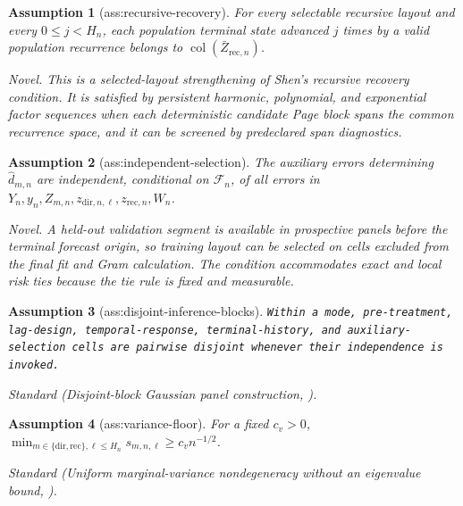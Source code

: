 \documentclass{article}
\newtheorem{assumption}{Assumption}
\begin{document}
\begin{assumption}[ass:recursive-recovery]\label{ass:recursive-recovery}
For every selectable recursive layout and every \(0\le j<H_n\), each population terminal state advanced \(j\) times by a valid population recurrence belongs to \(\operatorname{col}(\bar Z_{\mathrm{rec},n})\).
\par\smallskip\noindent\emph{Novel.} This is a selected-layout strengthening of Shen's recursive recovery condition. It is satisfied by persistent harmonic, polynomial, and exponential factor sequences when each deterministic candidate Page block spans the common recurrence space, and it can be screened by predeclared span diagnostics.
\end{assumption}

\begin{assumption}[ass:independent-selection]\label{ass:independent-selection}
The auxiliary errors determining \(\widehat d_{m,n}\) are independent, conditional on \(\mathcal F_n\), of all errors in \(Y_n,y_n,Z_{m,n},z_{\mathrm{dir},n,\ell},z_{\mathrm{rec},n},W_n\).
\par\smallskip\noindent\emph{Novel.} A held-out validation segment is available in prospective panels before the terminal forecast origin, so training layout can be selected on cells excluded from the final fit and Gram calculation. The condition accommodates exact and local risk ties because the tie rule is fixed and measurable.
\end{assumption}

\begin{assumption}[ass:disjoint-inference-blocks]\label{ass:disjoint-inference-blocks}
\texttt{Within a mode,\allowbreak{} pre-\allowbreak{}treatment,\allowbreak{} lag-\allowbreak{}design,\allowbreak{} temporal-\allowbreak{}response,\allowbreak{} terminal-\allowbreak{}history,\allowbreak{} and auxiliary-\allowbreak{}selection cells are pairwise disjoint whenever their independence is invoked.}
\par\smallskip\noindent\emph{Standard} (Disjoint-block Gaussian panel construction, \cite{Shen2026TWSF}).
\end{assumption}

\begin{assumption}[ass:variance-floor]\label{ass:variance-floor}
For a fixed \(c_v>0\), \(\min_{m\in\{\mathrm{dir},\mathrm{rec}\},\ell\le H_n}s_{m,n,\ell}\ge c_vn^{-1/2}\).
\par\smallskip\noindent\emph{Standard} (Uniform marginal-variance nondegeneracy without an eigenvalue bound, \cite{ChernozhukovChetverikovKato2015}).
\end{assumption}
\end{document}
